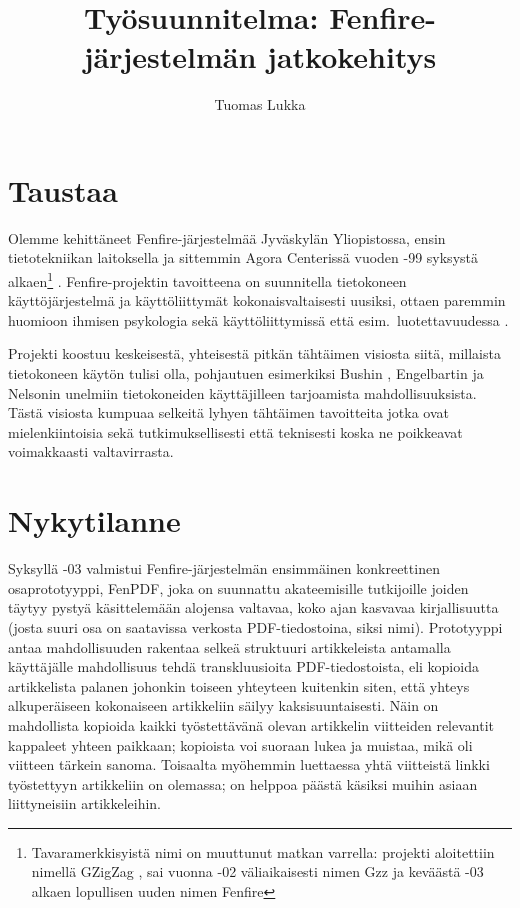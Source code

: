 \documentclass{article}
\begin{document}
\title{Työsuunnitelma: Fenfire-järjestelmän jatkokehitys}
\author{Tuomas Lukka}
\date{}

\maketitle

\section{Taustaa}

Olemme kehittäneet Fenfire-järjestelmää Jyväskylän Yliopistossa,
ensin tietotekniikan laitoksella ja sittemmin Agora Centerissä
vuoden -99 syksystä alkaen\footnote{
Tavara\-merkki\-syistä nimi on muuttunut matkan varrella: projekti aloitettiin 
nimellä GZigZag \cite{lukka99cybertext}, 
sai vuonna -02
väliaikaisesti nimen Gzz ja keväästä -03 alkaen lopullisen uuden
nimen Fenfire} \cite{lukka99cybertext}.
Fenfire-projektin tavoitteena on suunnitella tietokoneen 
käyttö\-jär\-jes\-tel\-mä ja käyttöliittymät kokonaisvaltaisesti uusiksi,
ottaen paremmin huo\-mioon ihmisen psykologia sekä käyttöliittymissä
että esim.\ luotettavuudessa \cite{fallenstein03storm}.

Projekti koostuu keskeisestä, yhteisestä pitkän tähtäimen
visiosta siitä, millaista tietokoneen käytön tulisi olla,
pohjautuen esimerkiksi
Bushin , Engelbartin 
ja Nelsonin  unelmiin tietokoneiden käyttäjilleen tarjoamista
mahdollisuuksista.
Tästä visiosta kumpuaa selkeitä
lyhyen tähtäimen tavoitteita jotka ovat mielenkiintoisia 
sekä tutkimuksellisesti että teknisesti koska ne poikkeavat voimakkaasti
valtavirrasta.



\section{Nykytilanne}

Syksyllä -03 valmistui
Fenfire-järjestelmän ensimmäinen konkreettinen osaprototyyppi, FenPDF, 
joka on suunnattu akateemisille tutkijoille joiden täytyy pystyä käsittelemään
alojensa valtavaa, koko ajan kasvavaa kirjallisuutta (josta suuri osa on saatavissa
verkosta PDF-tiedostoina, siksi nimi). 
Prototyyppi antaa mahdollisuuden
rakentaa selkeä struktuuri artikkeleista antamalla käyttäjälle
mahdollisuus tehdä transkluusioita \cite{ted-xanalogical-structure-needed}
PDF-tiedostoista, eli kopioida artikkelista palanen johonkin toiseen yhteyteen
kuitenkin siten, että yhteys alkuperäiseen kokonaiseen artikkeliin säilyy kaksisuuntaisesti.
Näin on mahdollista kopioida kaikki työstettävänä olevan artikkelin viitteiden
relevantit kappaleet yhteen paikkaan; kopioista voi suoraan lukea ja muistaa, 
mikä oli viitteen tärkein sanoma. Toisaalta myöhemmin luettaessa yhtä viitteistä
linkki työstettyyn artikkeliin on olemassa; on helppoa päästä käsiksi
muihin asiaan liittyneisiin artikkeleihin. 
\end{document}

